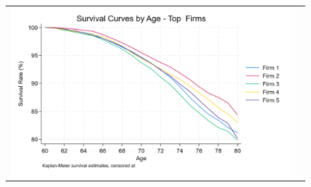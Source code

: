 \documentclass[12pt]{article}
\begin{document}
 
  \begin{figure}[H]
\caption{}
 \label{fig:ie4_11}
\centering{}%
\begin{tabular}{cc}
\includegraphics[scale=0.2]{figures/IE4/IE4_survival_curves_by_age_top_firms.png} 
\end{tabular}
\end{figure} 
\end{document}
